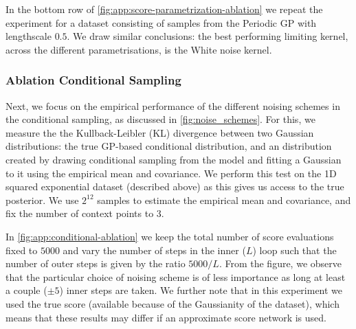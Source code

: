 In the bottom row of \cref{fig:app:score-parametrization-ablation} we repeat the experiment for a dataset consisting of samples from the Periodic GP with lengthscale $0.5$.
We draw similar conclusions: the best performing limiting kernel, across the different parametrisations, is the White noise kernel.

\subsubsection{Ablation Conditional Sampling}

Next, we focus on the empirical performance of the different noising schemes in the conditional sampling, as discussed in \cref{fig:noise_schemes}.
For this, we measure the the Kullback-Leibler (KL) divergence between two Gaussian distributions: the true GP-based conditional distribution, and an distribution created by drawing conditional sampling from the model and fitting a Gaussian to it using the empirical mean and covariance.
We perform this test on the 1D squared exponential dataset (described above) as this gives us access to the true posterior.
We use $2^{12}$ samples to estimate the empirical mean and covariance, and fix the number of context points to 3.

In \cref{fig:app:conditional-ablation} we keep the total number of score evaluations fixed to $5000$ and vary the number of steps in the inner ($L$) loop such that the number of outer steps is given by the ratio $5000/L$.
From the figure, we observe that the particular choice of noising scheme is of less importance as long at least a couple ($\pm 5$) inner steps are taken.
We further note that in this experiment we used the true score (available because of the Gaussianity of the dataset), which means that these results may differ if an approximate score network is used.

